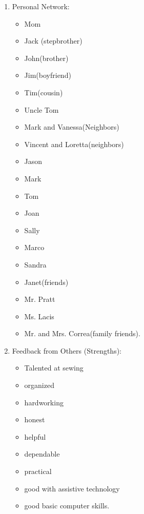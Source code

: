 \begin{enumerate}[leftmargin=1cm]
	\item Personal Network:
	      \begin{multicols}{2}\begin{itemize}
			      \item Mom
			      \item Jack \break (stepbrother)
			      \item John\break  (brother)
			      \item Jim\break  (boyfriend)
			      \item Tim\break  (cousin)
			      \item Uncle Tom
			      \item Mark and Vanessa\break  (Neighbors)
			      \item Vincent and Loretta\break  (neighbors)
			      \item Jason
			      \item Mark
			      \item Tom
			      \item Joan
			      \item Sally
			      \item Marco
			      \item Sandra
			      \item Janet\break  (friends)
			      \item Mr. Pratt
			      \item Ms. Lacis
			      \item Mr. and Mrs. Correa\break  (family friends).
		      \end{itemize}\end{multicols}
	\item Feedback from Others (Strengths):
	      \begin{multicols}{2}\begin{itemize}
			      \item Talented at sewing
			      \item organized
			      \item hardworking
			      \item honest
			      \item helpful
			      \item dependable
			      \item practical
			      \item good with assistive technology
			      \item good basic computer skills.
		      \end{itemize}\end{multicols}

\end{enumerate}
